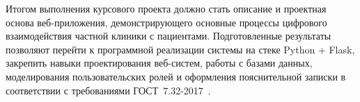 Итогом выполнения курсового проекта должно стать описание и проектная основа веб-приложения, демонстрирующего основные процессы цифрового взаимодействия частной клиники с пациентами. Подготовленные результаты позволяют перейти к программной реализации системы на стеке Python + Flask, закрепить навыки проектирования веб-систем, работы с базами данных, моделирования пользовательских ролей и оформления пояснительной записки в соответствии с требованиями ГОСТ~7.32-2017~\cite{gost_report}.
